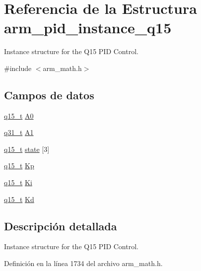 \hypertarget{structarm__pid__instance__q15}{}\section{Referencia de la Estructura arm\+\_\+pid\+\_\+instance\+\_\+q15}
\label{structarm__pid__instance__q15}


Instance structure for the Q15 P\+ID Control.  




{\ttfamily \#include $<$arm\+\_\+math.\+h$>$}

\subsection*{Campos de datos}
\begin{DoxyCompactItemize}
\item 
\hyperlink{arm__math_8h_ab5a8fb21a5b3b983d5f54f31614052ea}{q15\+\_\+t} \hyperlink{structarm__pid__instance__q15_a1aa73268c65cea0c7bc66bb70ff35205}{A0}
\item 
\hyperlink{arm__math_8h_adc89a3547f5324b7b3b95adec3806bc0}{q31\+\_\+t} \hyperlink{structarm__pid__instance__q15_aeb897c84724b56948e4222aca8d0e1f4}{A1}
\item 
\hyperlink{arm__math_8h_ab5a8fb21a5b3b983d5f54f31614052ea}{q15\+\_\+t} \hyperlink{structarm__pid__instance__q15_a4c4e19d77015f5f7a31a1daf0faf31b6}{state} \mbox{[}3\mbox{]}
\item 
\hyperlink{arm__math_8h_ab5a8fb21a5b3b983d5f54f31614052ea}{q15\+\_\+t} \hyperlink{structarm__pid__instance__q15_afef61fb3b64c73f2cd0c91d9dcf95679}{Kp}
\item 
\hyperlink{arm__math_8h_ab5a8fb21a5b3b983d5f54f31614052ea}{q15\+\_\+t} \hyperlink{structarm__pid__instance__q15_a19d5059baf06dd52266260d096702d0a}{Ki}
\item 
\hyperlink{arm__math_8h_ab5a8fb21a5b3b983d5f54f31614052ea}{q15\+\_\+t} \hyperlink{structarm__pid__instance__q15_abf38d18de1e16bc6d86846fedf8534fe}{Kd}
\end{DoxyCompactItemize}


\subsection{Descripción detallada}
Instance structure for the Q15 P\+ID Control. 

Definición en la línea 1734 del archivo arm\+\_\+math.\+h.



